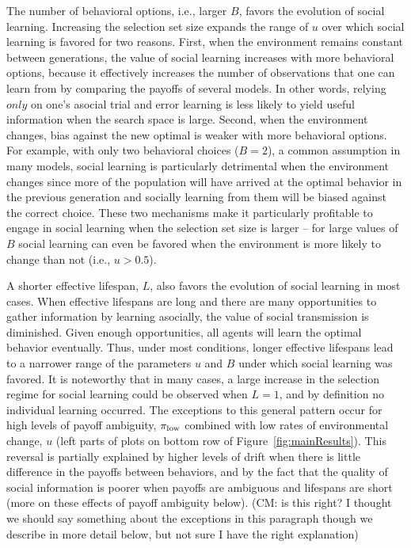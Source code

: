 \documentclass[letterpaper,11.5pt]{scrartcl}
\newcommand{\cm}[1]{{\textcolor{mypurple} {({\tiny CM:} #1)}}}
\begin{document}
The number of behavioral options, i.e., larger $B$, favors the evolution of social learning. Increasing the selection set size expands the range of $u$ over which social learning is favored for two reasons. First, when the environment remains constant between generations, the value of social learning increases with more behavioral options, because it effectively increases the number of observations that one can learn from by comparing the payoffs of several models. In other words, relying $only$ on one's asocial trial and error learning is less likely to yield useful information when the search space is large. Second, when the environment changes, bias against the new optimal is weaker with more behavioral options. For example, with only two behavioral choices ($B = 2$), a common assumption in many models, social learning is particularly detrimental when the environment changes since more of the population will have arrived at the optimal behavior in the previous generation and socially learning from them will be biased against the correct choice. These two mechanisms make it particularly profitable to engage in social learning when the selection set size is larger -- for large values of $B$ social learning can even be favored when the environment is more likely to change than not (i.e., $u>0.5$). 

A shorter effective lifespan, $L$, also favors the evolution of social learning in most cases. When effective lifespans are long and there are many opportunities to gather information by learning asocially, the value of social transmission is diminished. Given enough opportunities, all agents will learn the optimal behavior eventually. Thus, under most conditions, longer effective lifespans lead to a narrower range of the parameters $u$ and $B$ under which social learning was favored. It is noteworthy that in many cases, a large increase in the selection regime for social learning could be observed when $L=1$, and by definition no individual learning occurred. The exceptions to this general pattern occur for high levels of payoff ambiguity, $\pi_{\mathrm{low}}$ combined with low rates of environmental change, $u$ (left parts of plots on bottom row of Figure~\ref{fig:mainResults}). This reversal is partially explained by higher levels of drift when there is little difference in the payoffs between behaviors, and by the fact that the quality of social information is poorer when payoffs are ambiguous and lifespans are short (more on these effects of payoff ambiguity below).  \cm{is this right? I thought we should say something about the exceptions in this paragraph though we describe in more detail below, but not sure I have the right explanation}
\end{document}
